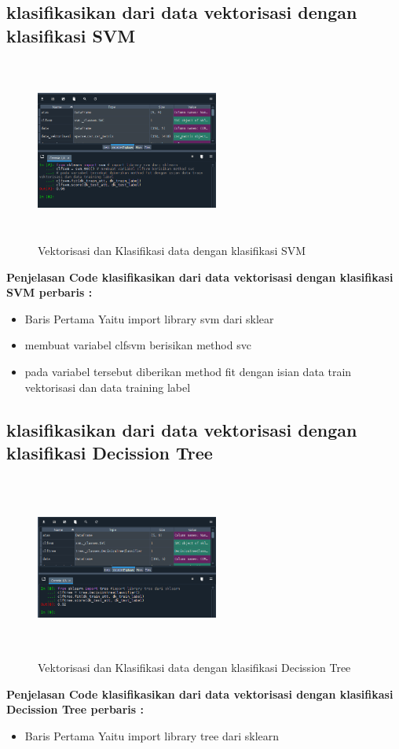 \subsection{klasifikasikan dari data vektorisasi dengan klasifikasi SVM}
\begin{figure}[!htbp]
	\centering
	\includegraphics[width=6cm,height=6cm]{figures/Cp4-4.png}
	\caption{Vektorisasi dan Klasifikasi data dengan klasifikasi SVM}
	\label{penanda}
\end{figure}
\textbf{Penjelasan Code klasifikasikan dari data vektorisasi dengan klasifikasi SVM perbaris :}
\begin{itemize}
	\item Baris Pertama Yaitu import library svm dari sklear
	\item membuat variabel clfsvm berisikan method svc
	\item pada variabel tersebut diberikan method fit dengan isian data train vektorisasi dan data training label
\end{itemize}

\subsection{klasifikasikan dari data vektorisasi dengan klasifikasi Decission Tree}
\begin{figure}[!htbp]
	\centering
	\includegraphics[width=6cm,height=6cm]{figures/Cp4-5.png}
	\caption{Vektorisasi dan Klasifikasi data dengan klasifikasi Decission Tree}
	\label{penanda}
\end{figure}
\textbf{Penjelasan Code klasifikasikan dari data vektorisasi dengan klasifikasi Decission Tree perbaris :}
\begin{itemize}
	\item Baris Pertama Yaitu import library tree dari sklearn
\end{itemize}

